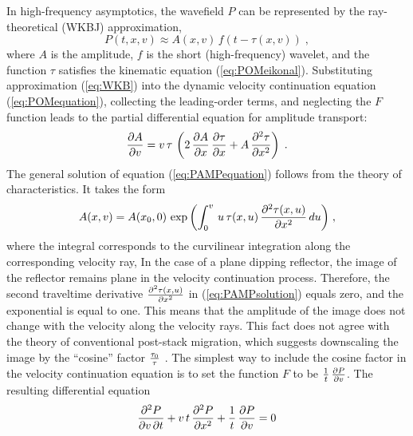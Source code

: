 In high-frequency asymptotics, the wavefield $P$ can be
represented by the ray-theoretical (WKBJ) approximation,
\begin{equation}
P(t,x,v) \approx A(x,v)\,f\left(t - \tau(x,v)\right)\;, 
\label{eq:WKB} 
\end{equation}
where $A$ is the amplitude, $f$ is the short (high-frequency) wavelet,
and the function $\tau$ satisfies the kinematic equation
(\ref{eq:POMeikonal}). Substituting approximation (\ref{eq:WKB}) into
the dynamic velocity continuation equation (\ref{eq:POMequation}),
collecting the leading-order terms, and neglecting the $F$ function
leads to the partial differential equation for amplitude transport:
\begin{equation}
{\partial A \over \partial v} = v\,\tau\,\left(2\,
{\partial A \over \partial x}\,
{\partial \tau \over \partial x} + A\,
{\partial^2 \tau \over \partial x^2}\right)\;.
\label{eq:PAMPequation} 
\end{equation}
The general solution of equation (\ref{eq:PAMPequation}) follows from the
theory of characteristics. It takes the form
\begin{equation}
A(x,v) = A(x_0,0)\,\exp{\left(\int_0^{v}\,u\,\tau(x,u)\,
{\partial^2 \tau(x,u) \over \partial x^2}\,du\right)}\;,
\label{eq:PAMPsolution} 
\end{equation}
where the integral corresponds to the
curvilinear integration along the corresponding velocity ray, 
In the case of a plane dipping reflector, the image of the reflector remains
plane in the velocity continuation process. Therefore, the second
traveltime derivative ${\partial^2 \tau(x,u) \over \partial x^2}$ in
(\ref{eq:PAMPsolution}) equals zero, and the exponential is equal to
one. This means that the amplitude of the image does not change with
the velocity along the velocity rays. This fact does not agree with the
theory of conventional post-stack migration, which suggests
downscaling the image by the ``cosine'' factor $\tau_0 \over
\tau$ \cite[]{GEO46-05-07170733,Levin.sep.48.147}. The simplest way to
include the cosine factor in the velocity continuation equation is to
set the function $F$ to be ${1 \over t}\,{\partial P \over \partial
v}$. The resulting differential equation
\begin{equation}
{{\partial^2 P} \over {\partial v\, \partial t}} +
v\,t\,{{\partial^2 P} \over {\partial x^2}} +
{1 \over t}\,{\partial P \over \partial v} = 0
\label{eq:POMequation2} 
\end{equation}
